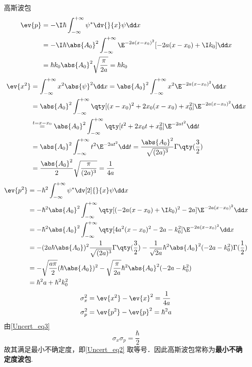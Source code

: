 \begin{example}{高斯波包}
\begin{equation}
\begin{aligned}
\ev{p}&=-\I\hbar\int_{-\infty}^{+\infty}\psi^{*}\dv{}{x}\psi\dd x\\
&=-\I\hbar\abs{A_0}^2\int_{-\infty}^{+\infty}\E^{-2a(x-x_0)^2}[-2a(x-x_0)+\I k_0]\dd x\\
&=\hbar k_0\abs{A_0}^2\sqrt{\frac{\pi}{2a}}=\hbar k_0
\end{aligned}
\end{equation}
\begin{equation}
\begin{aligned}
\ev{x^2}&=\int_{-\infty}^{+\infty}x^2\abs{\psi}^2\dd x=\abs{A_0}^2\int_{-\infty}^{+\infty}x^2\E^{-2a(x-x_0)^2}\dd x\\
&=\abs{A_0}^2\int_{-\infty}^{+\infty}\qty[(x-x_0)^2+2x_0(x-x_0)+x_0^2]\E^{-2a(x-x_0)^2}\dd x\\
&\overset{t=x-x_0}{=}\abs{A_0}^2\int_{-\infty}^{+\infty}\qty[t^2+2x_0t+x_0^2]\E^{-2at^2}\dd t\\
&=\abs{A_0}^2\int_{-\infty}^{+\infty}t^2\E^{-2at^2}\dd t
=\frac{\abs{A_0}^2}{\sqrt{(2a)^3}}\Gamma\qty(\frac{3}{2})\\
&=\frac{\abs{A_0}^2}{2}\sqrt{\frac{\pi}{(2a)^3}}=\frac{1}{4a}
\end{aligned}
\end{equation}
\begin{equation}
\begin{aligned}
\ev{p^2}&=-\hbar^2 \int_{-\infty}^{+\infty}\psi^{*}\dv[2]{}{x}\psi\dd x\\
&=-\hbar^2\abs{A_0}^2\int_{-\infty}^{+\infty}\qty[(-2a(x-x_0)+\I k_0)^2-2a]\E^{-2a(x-x_0)^2}\dd x\\
&=-\hbar^2\abs{A_0}^2\int_{-\infty}^{+\infty}\qty[4a^2(x-x_0)^2-2a-k_0^2]\E^{-2a(x-x_0)^2}\dd x\\
&=-(2a\hbar\abs{A_0})^2\frac{1}{\sqrt{(2a)^3}}\Gamma\qty(\frac{3}{2})-\frac{1}{\sqrt{2a}}\hbar^2 \abs{A_0}^2(-2a-k_0^2)\Gamma(\frac{1}{2})\\
&=-\sqrt{\frac{a\pi}{2}}(\hbar\abs{A_0})^2-\sqrt{\frac{\pi}{2a}}\hbar^2 \abs{A_0}^2(-2a-k_0^2)\\
&=\hbar^2a+\hbar^2k_0^2
\end{aligned}
\end{equation}
\begin{equation}\label{Uncert_eq3}
\begin{aligned}
\sigma_x^2&=\ev{x^2}-\ev{x}^2=\frac{1}{4a} \\
\sigma_p^2&=\ev{p^2}-\ev{p}^2=\hbar^2a
\end{aligned}
\end{equation}
由\autoref{Uncert_eq3} 
\begin{equation}
\sigma_x\sigma_p=\frac{\hbar}{2}
\end{equation}
故其满足最小不确定度，即\autoref{Uncert_eq2} 取等号．因此高斯波包常称为\textbf{最小不确定度波包}.
\end{example}

